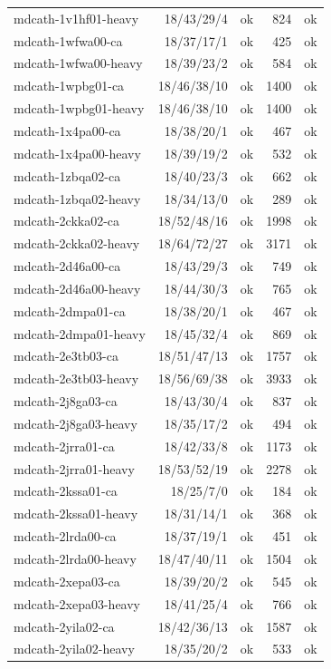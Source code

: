 \begin{small}
\begin{longtable}{lrlrl}
mdcath-1v1hf01-heavy & 18/43/29/4 & ok & 824 & ok\\
mdcath-1wfwa00-ca & 18/37/17/1 & ok & 425 & ok\\
mdcath-1wfwa00-heavy & 18/39/23/2 & ok & 584 & ok\\
mdcath-1wpbg01-ca & 18/46/38/10 & ok & 1400 & ok\\
mdcath-1wpbg01-heavy & 18/46/38/10 & ok & 1400 & ok\\
mdcath-1x4pa00-ca & 18/38/20/1 & ok & 467 & ok\\
mdcath-1x4pa00-heavy & 18/39/19/2 & ok & 532 & ok\\
mdcath-1zbqa02-ca & 18/40/23/3 & ok & 662 & ok\\
mdcath-1zbqa02-heavy & 18/34/13/0 & ok & 289 & ok\\
mdcath-2ckka02-ca & 18/52/48/16 & ok & 1998 & ok\\
mdcath-2ckka02-heavy & 18/64/72/27 & ok & 3171 & ok\\
mdcath-2d46a00-ca & 18/43/29/3 & ok & 749 & ok\\
mdcath-2d46a00-heavy & 18/44/30/3 & ok & 765 & ok\\
mdcath-2dmpa01-ca & 18/38/20/1 & ok & 467 & ok\\
mdcath-2dmpa01-heavy & 18/45/32/4 & ok & 869 & ok\\
mdcath-2e3tb03-ca & 18/51/47/13 & ok & 1757 & ok\\
mdcath-2e3tb03-heavy & 18/56/69/38 & ok & 3933 & ok\\
mdcath-2j8ga03-ca & 18/43/30/4 & ok & 837 & ok\\
mdcath-2j8ga03-heavy & 18/35/17/2 & ok & 494 & ok\\
mdcath-2jrra01-ca & 18/42/33/8 & ok & 1173 & ok\\
mdcath-2jrra01-heavy & 18/53/52/19 & ok & 2278 & ok\\
mdcath-2kssa01-ca & 18/25/7/0 & ok & 184 & ok\\
mdcath-2kssa01-heavy & 18/31/14/1 & ok & 368 & ok\\
mdcath-2lrda00-ca & 18/37/19/1 & ok & 451 & ok\\
mdcath-2lrda00-heavy & 18/47/40/11 & ok & 1504 & ok\\
mdcath-2xepa03-ca & 18/39/20/2 & ok & 545 & ok\\
mdcath-2xepa03-heavy & 18/41/25/4 & ok & 766 & ok\\
mdcath-2yila02-ca & 18/42/36/13 & ok & 1587 & ok\\
mdcath-2yila02-heavy & 18/35/20/2 & ok & 533 & ok\\

\end{longtable}
\end{small}
